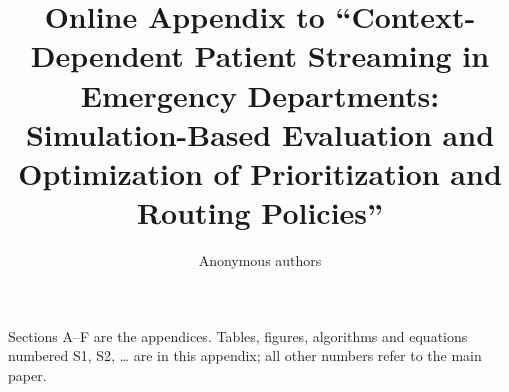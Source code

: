 \documentclass[12pt,onecolumn,draftclsnofoot,journal]{IEEEtran}
\begin{document}
\title{Online Appendix to ``Context-Dependent Patient Streaming in Emergency Departments: Simulation-Based Evaluation and Optimization of Prioritization and Routing Policies''}
\author{Anonymous authors}
\maketitle

\noindent Sections A--F are the appendices. Tables, figures, algorithms and equations numbered S1, S2, \dots{} are in this appendix; all other numbers refer to the main paper.

\appendices
\renewcommand{\thetable}{S\arabic{table}}
\renewcommand{\thefigure}{S\arabic{figure}}
\renewcommand{\thealgorithm}{S\arabic{algorithm}}
\renewcommand{\theequation}{S\arabic{equation}}




\end{document}
